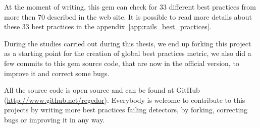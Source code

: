 At the moment of writing, this gem can check for 33 different best practices from more then 70 described in the web site.
It is possible to read more details about these 33 best practices in the appendix~\ref{app:rails_best_practices}.

During the studies carried out during this thesis, 
we end up forking this project as a starting point for the creation of global best practices metric,
we also did a few commits to this gem source code, that are now in the official version, to improve it and correct some bugs. 

All the source code is open source and can be found at GitHub (\url{http://www.github.net/regedor}).
Everybody is welcome to contribute to this projects by writing more best practices failing detectors,
by forking, correcting bugs or improving it in any way.



